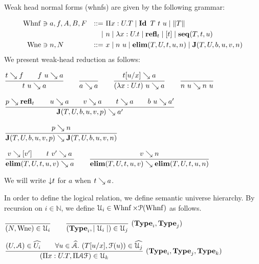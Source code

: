 \documentclass[a4paper,english]{lipics-utf8x}
\begin{document}

  Weak head normal forms (whnfs) are given by the following grammar:

  \begin{align*}
    \operatorname{Whnf} &\ni a,f,A,B,F &::=~& \Pi x:U.T \mid \operatorname{\mathbf{Id}~} T\ t\ u \mid \|T\| \\
        &&\mid~& n \mid \lambda x:U.t \mid \operatorname{\mathbf{refl}}_t \mid [t] \mid \operatorname{\mathbf{seq}}(T,t,u) \\
    \operatorname{Wne}  &\ni n,N &::=~& x \mid n~u \mid \operatorname{\mathbf{elim}}(T,U,t,u,n) \mid \operatorname{\mathbf{J}} (T,U,b,u,v,n)
  \end{align*}
  We present weak-head reduction as follows:

  \begin{center}
  \(
    \ru{t \rew f \qquad
        f~u \rew a
      }{t~u \rew a}
    \qquad
    \ru{}{a \rew a}
    \qquad
    \ru{t[u/x] \rew a
      }{(\lambda x:U.t)~u \rew a}
    \qquad
    \ru{}{n~u \rew n~u}
  \)
  \end{center}

  \begin{center}
  \(
    \ru{p \rew \refl_t \qquad
        u \rew a \qquad
        v \rew a \qquad
        t \rew a \qquad
        b\ u \rew a'
      }{\J (T,U,b,u,v,p) \rew a'}
  \)
  \end{center}

  \begin{center}
  \(
    \ru{p \rew n
      }{\J (T,U,b,u,v,p) \rew \J (T,U,b,u,v,n)}
  \)
  \end{center}

  \begin{center}
  \(
    \ru{v \rew [v'] \qquad
        t\ v' \rew a
      }{\elim(T,U,t,u,v) \rew a}
    \qquad
    \ru{v \rew n
      }{\elim(T,U,t,u,v) \rew \elim(T,U,t,u,n)}
  \)
  \end{center}
  We will write ${\downarrow} t$ for $a$ when $t \searrow a$.


  In order to define the logical relation, we define semantic universe
  hierarchy.
  By recursion on $i \in \mathbb{N}$, we define
  $\mathcal{U}_i \in \operatorname{Whnf} \times \mathcal{P}(\operatorname{Whnf})$ as follows.

  \begin{center}
  \(
    \ru{}{(N, \Wne) \in \U_i}
    \qquad
    \rux{}{(\Type_i, \mid \U_i \mid) \in \U_j}{(\Type_i,\Type_j)}
  \)
  \end{center}

  \begin{center}
  \(
    \rux{(U, \mathcal{A}) \in \widehat{U_i} \qquad
         \forall u \in \widehat{\mathcal{A}}.\ (T[u/x],\mathcal{F}(u)) \in
         \widehat{\U_j}
       }{(\Pi x:U.T, \Pi \mathcal{A} \mathcal{F}) \in \U_k
       }{(\Type_i, \Type_j, \Type_k)}
  \)
  \end{center}
\end{document}
